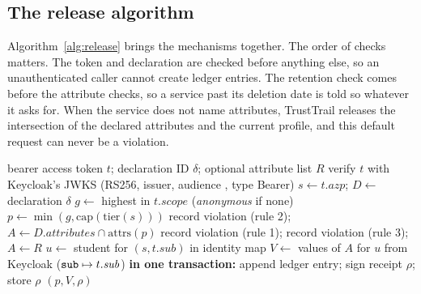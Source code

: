 \subsection{The release algorithm}
\label{sec:design-release}

Algorithm~\ref{alg:release} brings the mechanisms together. The order of checks matters. The token and declaration are checked before anything else, so an unauthenticated caller cannot create ledger entries. The retention check comes before the attribute checks, so a service past its deletion date is told so whatever it asks for. When the service does not name attributes, TrustTrail releases the intersection of the declared attributes and the current profile, and this default request can never be a violation.

\begin{algorithm}[t]
\caption{}
\label{alg:release}
\begin{algorithmic}[1]
\Require bearer access token $t$; declaration ID $\delta$; optional attribute list $R$
\State verify $t$ with Keycloak's JWKS (RS256, issuer, audience , type Bearer) 
\State $s \gets t.\mathit{azp}$; $D \gets$ declaration $\delta$ 
\State $g \gets$ highest  in $t.\mathit{scope}$ (\textit{anonymous} if none)
\State $p \gets \min(g, \mathrm{cap}(\mathrm{tier}(s)))$ 
 \State {}  \EndIf
{} \State record violation (rule 2);   \EndIf
{} \State $A \gets D.\mathit{attributes} \cap \mathrm{attrs}(p)$
\Else
   \State record violation (rule 1);   \EndIf
   \State record violation (rule 3);   \EndIf
   \State {}   \EndIf
  \State $A \gets R$
\EndIf
\State $u \gets$ student for $(s, t.\mathit{sub})$ in identity map 
\State $V \gets$ values of $A$ for $u$ from Keycloak ($\texttt{sub} \mapsto t.\mathit{sub}$)
\State \textbf{in one transaction:} append ledger entry; sign receipt $\rho$; store $\rho$
\State \Return $(p, V, \rho)$
\end{algorithmic}
\end{algorithm}
